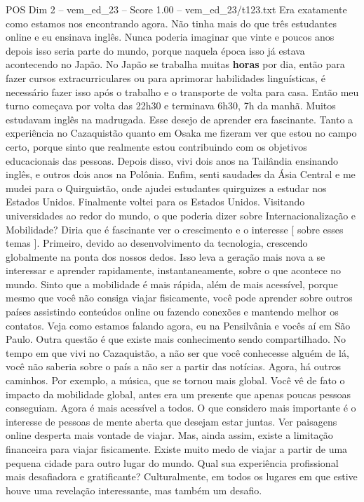 \begin{textsample}{POS Dim 2 – vem\_ed\_23 – Score 1.00 – vem\_ed\_23/t123.txt}
Era exatamente como estamos nos encontrando agora.
Não tinha mais do que três estudantes online e eu ensinava inglês.
Nunca poderia imaginar que vinte e poucos anos depois isso seria parte do mundo, porque naquela época isso já estava acontecendo no Japão.
No Japão se trabalha muitas \textbf{horas} por dia, então para fazer cursos extracurriculares ou para aprimorar habilidades linguísticas, é necessário fazer isso após o trabalho e o transporte de volta para casa.
Então meu turno começava por volta das 22h30 e terminava 6h30, 7h da manhã.
Muitos estudavam inglês na madrugada.
Esse desejo de aprender era fascinante.
Tanto a experiência no Cazaquistão quanto em Osaka me fizeram ver que estou no campo certo, porque sinto que realmente estou contribuindo com os objetivos educacionais das pessoas.
Depois disso, vivi dois anos na Tailândia ensinando inglês, e outros dois anos na Polônia.
Enfim, senti saudades da Ásia Central e me mudei para o Quirguistão, onde ajudei estudantes quirguizes a estudar nos Estados Unidos.
Finalmente voltei para os Estados Unidos.
Visitando universidades ao redor do mundo, o que poderia dizer sobre Internacionalização e Mobilidade?
Diria que é fascinante ver o crescimento e o interesse [ sobre esses temas ].
Primeiro, devido ao desenvolvimento da tecnologia, crescendo globalmente na ponta dos nossos dedos.
Isso leva a geração mais nova a se interessar e aprender rapidamente, instantaneamente, sobre o que acontece no mundo.
Sinto que a mobilidade é mais rápida, além de mais acessível, porque mesmo que você não consiga viajar fisicamente, você pode aprender sobre outros países assistindo conteúdos online ou fazendo conexões e mantendo melhor os contatos.
Veja como estamos falando agora, eu na Pensilvânia e vocês aí em São Paulo.
Outra questão é que existe mais conhecimento sendo compartilhado.
No tempo em que vivi no Cazaquistão, a não ser que você conhecesse alguém de lá, você não saberia sobre o país a não ser a partir das notícias.
Agora, há outros caminhos.
Por exemplo, a música, que se tornou mais global.
Você vê de fato o impacto da mobilidade global, antes era um presente que apenas poucas pessoas conseguiam.
Agora é mais acessível a todos.
O que considero mais importante é o interesse de pessoas de mente aberta que desejam estar juntas.
Ver paisagens online desperta mais vontade de viajar.
Mas, ainda assim, existe a limitação financeira para viajar fisicamente.
Existe muito medo de viajar a partir de uma pequena cidade para outro lugar do mundo.
Qual sua experiência profissional mais desafiadora e gratificante?
Culturalmente, em todos os lugares em que estive houve uma revelação interessante, mas também um desafio.

\end{textsample}
